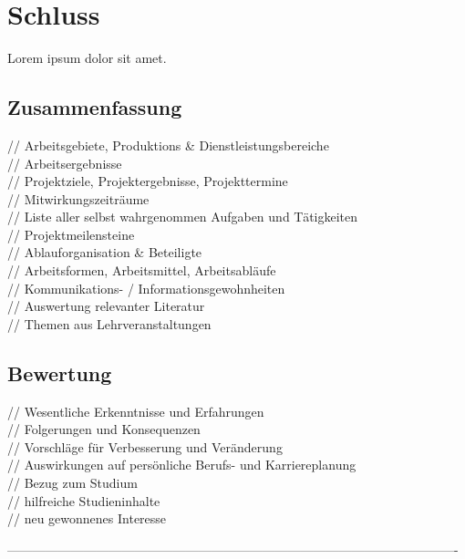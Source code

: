 \documentclass[12pt,a4paper,bibliography=totocnumbered,listof=totocnumbered]{scrartcl}
\begin{document}
\section{Schluss}
Lorem ipsum dolor sit amet.

\subsection{Zusammenfassung}
// Arbeitsgebiete, Produktions \& Dienstleistungsbereiche\\
// Arbeitsergebnisse\\
// Projektziele, Projektergebnisse, Projekttermine\\
// Mitwirkungszeiträume\\
// Liste aller selbst wahrgenommen Aufgaben und Tätigkeiten\\
// Projektmeilensteine\\
// Ablauforganisation \& Beteiligte\\
// Arbeitsformen, Arbeitsmittel, Arbeitsabläufe\\
// Kommunikations- / Informationsgewohnheiten\\
// Auswertung relevanter Literatur\\
// Themen aus Lehrveranstaltungen\\

\subsection{Bewertung}
// Wesentliche Erkenntnisse und Erfahrungen\\
// Folgerungen und Konsequenzen\\
// Vorschläge für Verbesserung und Veränderung\\
// Auswirkungen auf persönliche Berufs- und Karriereplanung\\
// Bezug zum Studium\\
// hilfreiche Studieninhalte\\
// neu gewonnenes Interesse\\
\pagebreak

%
----------------------------------------------------------------------------------------------------------
\renewcommand\refname{Quellenverzeichnis}


\pagebreak

\setcounter{page}{1}
\end{document}
